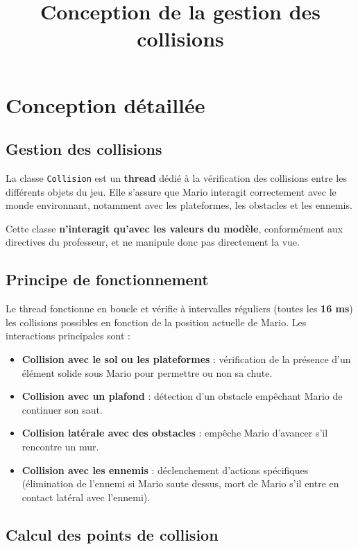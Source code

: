 \documentclass{report}
\title{Conception de la gestion des collisions}
\author{}
\date{}
\begin{document}
\maketitle

\section{Conception détaillée}

\subsection{Gestion des collisions}

La classe \texttt{Collision} est un \textbf{thread} dédié à la vérification des collisions entre les différents objets du jeu. Elle s'assure que Mario interagit correctement avec le monde environnant, notamment avec les plateformes, les obstacles et les ennemis.

Cette classe \textbf{n'interagit qu'avec les valeurs du modèle}, conformément aux directives du professeur, et ne manipule donc pas directement la vue.

\subsection{Principe de fonctionnement}

Le thread fonctionne en boucle et vérifie à intervalles réguliers (toutes les \textbf{16 ms}) les collisions possibles en fonction de la position actuelle de Mario. Les interactions principales sont :

\begin{itemize}
    \item \textbf{Collision avec le sol ou les plateformes} : vérification de la présence d'un élément solide sous Mario pour permettre ou non sa chute.
    \item \textbf{Collision avec un plafond} : détection d'un obstacle empêchant Mario de continuer son saut.
    \item \textbf{Collision latérale avec des obstacles} : empêche Mario d'avancer s'il rencontre un mur.
    \item \textbf{Collision avec les ennemis} : déclenchement d'actions spécifiques (élimination de l'ennemi si Mario saute dessus, mort de Mario s'il entre en contact latéral avec l'ennemi).
\end{itemize}

\subsection{Calcul des points de collision}
\end{document}
